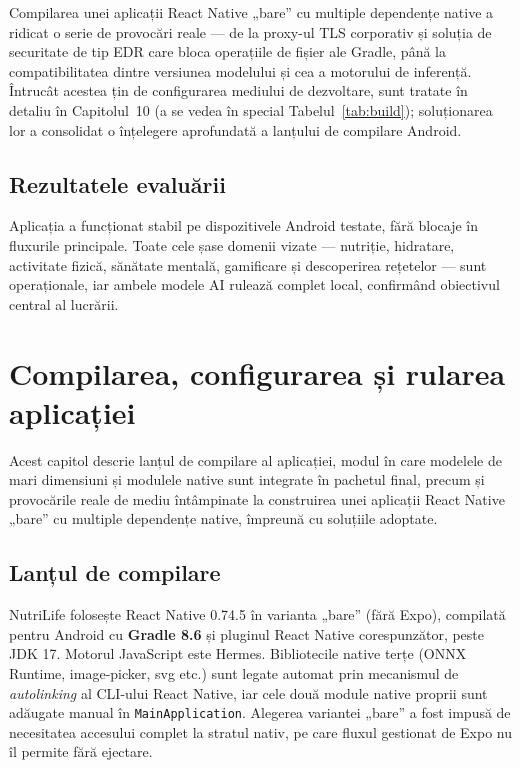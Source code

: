 \documentclass[12pt, a4paper, twoside]{report}
\numberwithin{equation}{section}
\begin{document}
Compilarea unei aplicații React Native „bare'' cu multiple dependențe native a ridicat o serie
de provocări reale --- de la proxy-ul TLS corporativ și soluția de securitate de tip EDR care
bloca operațiile de fișier ale Gradle, până la compatibilitatea dintre versiunea modelului și
cea a motorului de inferență. Întrucât acestea țin de configurarea mediului de dezvoltare, sunt
tratate în detaliu în Capitolul~10 (a se vedea în special Tabelul~\ref{tab:build}); soluționarea
lor a consolidat o înțelegere aprofundată a lanțului de compilare Android.

\section{Rezultatele evaluării}

Aplicația a funcționat stabil pe dispozitivele Android testate, fără blocaje în fluxurile
principale. Toate cele șase domenii vizate --- nutriție, hidratare, activitate fizică,
sănătate mentală, gamificare și descoperirea rețetelor --- sunt operaționale, iar ambele
modele AI rulează complet local, confirmând obiectivul central al lucrării.

\chapter{Compilarea, configurarea și rularea aplicației}

Acest capitol descrie lanțul de compilare al aplicației, modul în care modelele de mari
dimensiuni și modulele native sunt integrate în pachetul final, precum și provocările reale
de mediu întâmpinate la construirea unei aplicații React Native „bare'' cu multiple dependențe
native, împreună cu soluțiile adoptate.

\section{Lanțul de compilare}

NutriLife folosește React Native 0.74.5 în varianta „bare'' (fără Expo), compilată pentru
Android cu \textbf{Gradle 8.6} și pluginul React Native corespunzător, peste JDK 17. Motorul
JavaScript este Hermes. Bibliotecile native terțe (ONNX Runtime, image-picker, svg etc.) sunt
legate automat prin mecanismul de \textit{autolinking} al CLI-ului React Native, iar cele două
module native proprii sunt adăugate manual în \texttt{MainApplication}. Alegerea variantei
„bare'' a fost impusă de necesitatea accesului complet la stratul nativ, pe care fluxul
gestionat de Expo nu îl permite fără ejectare.
\end{document}
